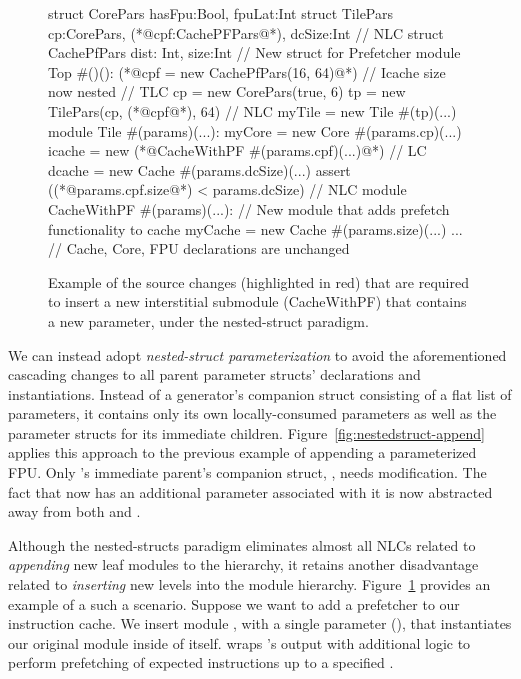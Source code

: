 \begin{figure}
\centering
\begin{phdl}
struct CorePars {hasFpu:Bool, fpuLat:Int}
struct TilePars {cp:CorePars, (*@\textcolor[rgb]{1,0,0}{cpf:CachePFPars}@*), dcSize:Int}      // NLC
struct CachePfPars {dist: Int, size:Int} // New struct for Prefetcher
module Top #()():
  (*@\textcolor[rgb]{1,0,0}{cpf = new CachePfPars(16, 64)}@*)  // Icache size now nested      // TLC
  cp = new CorePars(true, 6)
  tp = new TilePars(cp, (*@\textcolor[rgb]{1,0,0}{cpf}@*), 64)                                // NLC
  myTile = new Tile #(tp)(...)
module Tile #(params)(...):
  myCore = new Core  #(params.cp)(...)
  icache = new (*@\textcolor[rgb]{1,0,0}{CacheWithPF \#(params.cpf)(...)}@*)                   // LC
  dcache = new Cache #(params.dcSize)(...)
  assert ((*@\textcolor[rgb]{1,0,0}{params.cpf.size}@*) < params.dcSize)                      // NLC
module CacheWithPF #(params)(...):  // New module that adds prefetch functionality to cache
  myCache = new Cache #(params.size)(...)
... // Cache, Core, FPU declarations are unchanged
\end{phdl} 
\caption[Inserting a new module with nested structs.]{
Example of the source changes (highlighted in red) that are required to insert a new interstitial submodule (CacheWithPF) that contains a new parameter,
under the nested-struct paradigm.}
\label{fig:nestedstruct-insert}
\end{figure}

We can instead adopt \emph{nested-struct parameterization} to avoid the aforementioned cascading changes to all parent parameter structs' declarations and instantiations. 
Instead of a generator's companion struct consisting of a flat list of parameters, it contains only its own locally-consumed parameters as well as the parameter structs for its immediate children. 
Figure~\ref{fig:nestedstruct-append} applies this approach to the previous example of appending a parameterized FPU.
Only 's immediate parent's companion struct, , needs modification.
The fact that  now has an additional parameter associated with it is now abstracted away from both  and .

Although the nested-structs paradigm eliminates almost all NLCs related to {\em appending} new leaf modules to the hierarchy,
it retains another disadvantage related to {\em inserting} new levels into the module hierarchy.
Figure~\ref{fig:nestedstruct-insert} provides an example of a such a scenario.
Suppose we want to add a prefetcher to our instruction cache. 
We insert module , with a single parameter (), that instantiates our original  module inside of itself.
 wraps 's output with additional logic to perform prefetching of expected instructions up to a specified .

